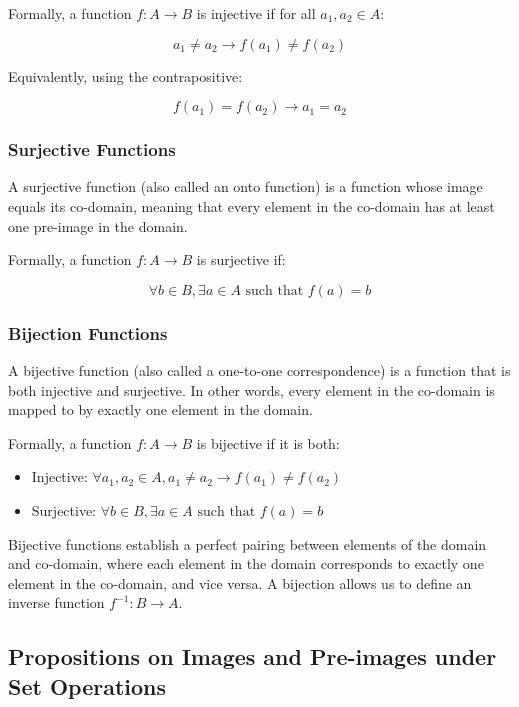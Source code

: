 Formally, a function \(f: A \to B\) is injective if for all \(a_1, a_2 \in A\):

\[
	a_1 \neq a_2 \to f(a_1) \neq f(a_2)
\]

Equivalently, using the contrapositive:

\[
	f(a_1) = f(a_2) \to a_1 = a_2
\]

\subsubsection{Surjective Functions}

A surjective function (also called an onto function) is a function whose image equals its co-domain, meaning that every element in the 
co-domain has at least one pre-image in the domain.

Formally, a function \(f: A \to B\) is surjective if:

\[
	\forall b \in B, \exists a \in A \text{ such that } f(a) = b
\]

\subsubsection{Bijection Functions}

A bijective function (also called a one-to-one correspondence) is a 
function that is both injective and surjective. In other words, every
 element in the co-domain is mapped to by exactly one element in the domain.

Formally, a function \(f: A \to B\) is bijective if it is both:

\begin{itemize}
	\item Injective: \(\forall a_1, a_2 \in A, a_1 \neq a_2 \to f(a_1) \neq f(a_2)\)
	\item Surjective: \(\forall b \in B, \exists a \in A \text{ such that } f(a) = b\)
\end{itemize}

Bijective functions establish a perfect pairing between elements of the domain and co-domain, where each element in the domain 
corresponds to exactly one element in the co-domain, and vice versa. A bijection allows us to define an inverse function \(f^{-1}: B \to A\).

\subsection{Propositions on Images and Pre-images under Set Operations}

